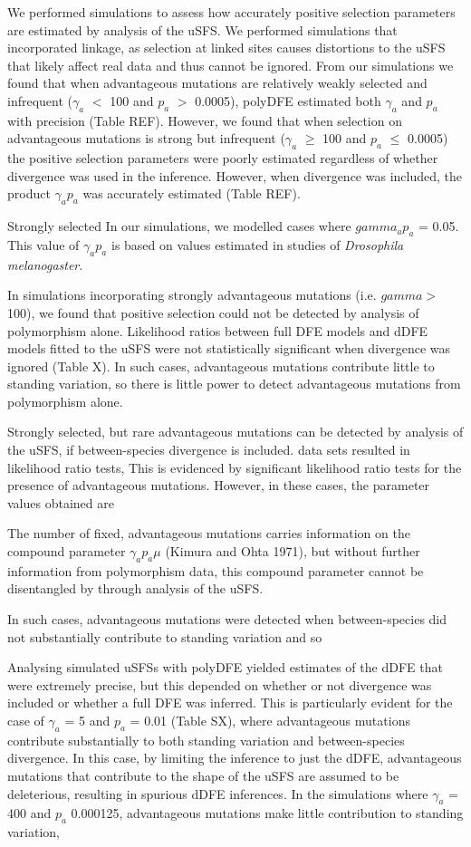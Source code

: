 \documentclass[11pt]{article}
\begin{document}
	We performed simulations to assess how accurately positive selection parameters are estimated by analysis of the uSFS. We performed simulations that incorporated linkage, as selection at linked sites causes distortions to the uSFS that likely affect real data and thus cannot be ignored. From our simulations we found that when  advantageous mutations are relatively weakly selected and infrequent ($\gamma_a$ $<$ 100 and $p_a$ $>$ 0.0005), polyDFE estimated both $\gamma_a$ and $p_a$ with precision (Table REF). However, we found that when selection on advantageous mutations is strong but infrequent ($\gamma_a$ $\geq$ 100 and $p_a$ $\leq$ 0.0005) the positive selection parameters were poorly estimated regardless of whether divergence was used in the inference. However, when divergence was included, the product $\gamma_a p_a$ was accurately estimated (Table REF).
		
	Strongly selected  In our simulations, we modelled cases where $gamma_a p_a$ = 0.05. This value of $\gamma_a p_a$ is based on values estimated in studies of \textit{Drosophila melanogaster}. 
	
	In simulations incorporating strongly advantageous mutations (i.e. $gamma >$ 100), we found that positive selection could not be detected by analysis of polymorphism alone. Likelihood ratios between full DFE models and dDFE models fitted to the uSFS were not statistically significant when divergence was ignored (Table X). In such cases, advantageous mutations contribute little to standing variation, so there is little power to detect advantageous mutations from polymorphism alone. 
	
	Strongly selected, but rare advantageous mutations can be detected by analysis of the uSFS, if between-species divergence is included. data sets resulted in likelihood ratio tests, 
	This is evidenced by significant likelihood ratio tests for the presence of advantageous mutations. However, in these cases, the parameter values obtained are 
	
	The number of fixed, advantageous mutations carries information on the compound parameter $\gamma_a p_a \mu$ (Kimura and Ohta 1971), but without further information from polymorphism data, this compound parameter cannot be disentangled by through analysis of the uSFS.
	
	In such cases, advantageous mutations were detected when between-species did not substantially contribute to standing variation and so 
	
	Analysing simulated uSFSs with polyDFE yielded estimates of the dDFE that were extremely precise, but this depended on whether or not divergence was included or whether a full DFE was inferred. This is particularly evident for the case of $\gamma_a$ = 5 and $p_a$ = 0.01 (Table SX), where advantageous mutations contribute substantially to both standing variation and between-species divergence. In this case, by limiting the inference to just the dDFE,  advantageous mutations that contribute to the shape of the uSFS are assumed to be deleterious, resulting in spurious dDFE inferences. In the simulations where $\gamma_a$ = 400 and $p_a$ 0.000125, advantageous mutations make little contribution to standing variation, 
	
\end{document}
